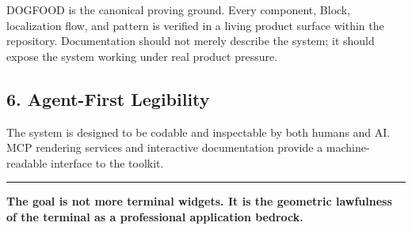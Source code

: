 DOGFOOD is the canonical proving ground. Every component, Block, localization flow, and pattern is verified in a living product surface within the repository. Documentation should not merely describe the system; it should expose the system working under real product pressure.

\subsection{6. Agent-First Legibility}\label{record-031-agent-first-legibility}

The system is designed to be codable and inspectable by both humans and AI. MCP rendering services and interactive documentation provide a machine-readable interface to the toolkit.

\begin{center}\rule{0.5\linewidth}{0.5pt}\end{center}

\textbf{The goal is not more terminal widgets. It is the geometric lawfulness of the terminal as a professional application bedrock.}

